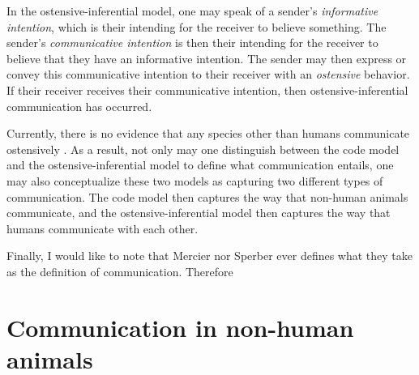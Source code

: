 In the ostensive-inferential model, one may speak of a sender's \emph{informative intention}, which is their intending for the receiver to believe something. The sender's \emph{communicative intention} is then their intending for the receiver to believe that they have an informative intention. The sender may then express or convey this communicative intention to their receiver with an \emph{ostensive} behavior. If their receiver receives their communicative intention, then ostensive-inferential communication has occurred.

Currently, there is no evidence that any species other than humans communicate ostensively \citep{Scott-Phillips18-communication}. As a result, not only may one distinguish between the code model and the ostensive-inferential model to define what communication entails, one may also conceptualize these two models as capturing two different types of communication. The code model then captures the way that non-human animals communicate, and the ostensive-inferential model then captures the way that humans communicate with each other.

Finally, I would like to note that Mercier nor Sperber ever defines what they take as the definition of communication. Therefore


\section{Communication in non-human animals}
\label{sec:comm:phylogeny}

